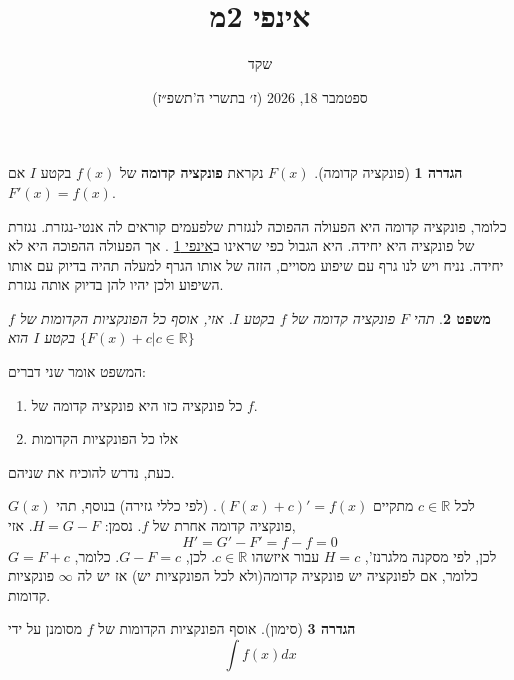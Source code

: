 \documentclass[12pt]{article}
\title{אינפי 2מ}
\author{שקד}
\date{ספטמבר 18, 2026 (ז׳ בתשרי ה'תשפ״ז)}
\makeatletter
\let\oldint\int
\renewcommand{\int}{\oldint\limits}
\theoremstyle{plain}
\newtheorem{theorem}{משפט}[section]      %
\theoremstyle{definition}
\newtheorem{definition}[theorem]{הגדרה}   %
\theoremstyle{remark}
\renewenvironment{proof}[1][\proofname]{\par
  \pushQED{\qed}%
  \normalfont \topsep6\p@\@plus6\p@\relax
  \trivlist
  \item[\hskip\labelsep\itshape #1\@addpunct{.}]\par\ignorespaces
}{%
  \popQED\endtrivlist\@endpefalse
}
\renewcommand{\qed}{\par\nobreak\hfill\qedsymbol\par}
\renewcommand{\proofname}{הוכחה}          %
\makeatother
\begin{document}
\maketitle

\tableofcontents
\newpage

\begin{definition}[פונקציה קדומה]
\label{85a11d}
\({F(x)}\) נקראת \textbf{פונקציה קדומה} של \({f(x)}\) בקטע \({I}\) אם \({F'(x)=f(x)}\).
\end{definition}
כלומר, פונקציה קדומה היא הפעולה ההפוכה לנגזרת שלפעמים קוראים לה אנטי-נגזרת.\newline{}
נגזרת של פונקציה היא יחידה. היא הגבול כפי שראינו ב\href{https://uni-folder.vercel.app/4 - פונקציות#3a733f}{אינפי 1}
. אך הפעולה ההפוכה היא לא יחידה. נניח ויש לנו גרף עם שיפוע מסויים, הזזה של אותו הגרף למעלה תהיה בדיוק עם אותו השיפוע ולכן יהיו להן בדיוק אותה נגזרת.\begin{theorem}
תהי \({F}\) פונקציה קדומה של \({f}\) בקטע \({I}\).\newline{}
אזי, אוסף כל הפונקציות הקדומות של \({f}\) בקטע \({I}\) הוא \({{\Big\{} F(x)+c|c \in \mathbb{R} \Big\}}\)
\end{theorem}
המשפט אומר שני דברים:\begin{enumerate}
\item כל פונקציה כזו היא פונקציה קדומה של \({f}\).
\item אלו כל הפונקציות הקדומות
\end{enumerate}
כעת, נדרש להוכיח את שניהם.\begin{proof}
לכל \({c \in \mathbb{R}}\) מתקיים \({(F(x)+c)'=f(x)}\). (לפי כללי גזירה)\newline{}
בנוסף, תהי \({G(x)}\) פונקציה קדומה אחרת של \({f}\).\newline{}
נסמן: \({H=G-F}\). אזי,\[
{H'=G'-F'=f-f=0}
\]
לכן, לפי מסקנה מלגרנז', \({H=c}\) עבור איזשהו \({c \in \mathbb{R}}\). לכן, \({G-F=c}\). כלומר, \({G=F+c}\)
\end{proof}
כלומר, אם לפונקציה יש פונקציה קדומה(ולא לכל הפונקציות יש) אז יש לה \({\infty}\) פונקציות קדומות.\begin{definition}[סימון]
אוסף הפונקציות הקדומות של \({f}\) מסומנן על ידי\[
{\int f(x)dx}
\]

\end{definition}
\end{document}
